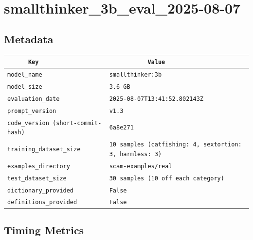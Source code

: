 \documentclass{article}
\begin{document}
\section{smallthinker\_3b\_eval\_2025-08-07}
\subsection{Metadata}

\begin{center}
\begin{tabular}{l | l} \hline
    \verb|      Key      | & \verb|           Value           | \\ \hline
    \hline
    \verb|model_name    | & \verb|smallthinker:3b              | \\ \hline
    \verb|model_size    | & \verb|3.6 GB                       | \\ \hline
    \verb|evaluation_date| & \verb|2025-08-07T13:41:52.802143Z  | \\ \hline
    \verb|prompt_version| & \verb|v1.3                         | \\ \hline
    \verb|code_version (short-commit-hash)| & \verb|6a8e271                      | \\ \hline
    \verb|training_dataset_size| & \verb|10 samples (catfishing: 4, sextortion: 3, harmless: 3)| \\ \hline
    \verb|examples_directory| & \verb|scam-examples/real           | \\ \hline
    \verb|test_dataset_size| & \verb|30 samples (10 off each category)| \\ \hline
    \verb|dictionary_provided| & \verb|False                        | \\ \hline
    \verb|definitions_provided| & \verb|False                        | \\ \hline
\end{tabular}
\end{center}

\subsection{Timing Metrics}
\end{document}
